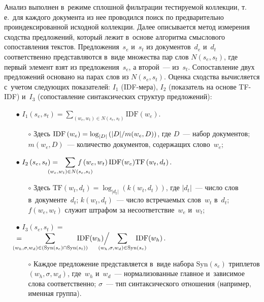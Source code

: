 \begin{multicols}{2}
  Анализ выполнен в~режиме сплошной фильтрации тестируемой коллекции, 
т.\,е.\ для каждого документа из нее проводился поиск по предварительно 
проиндексированной исходной коллекции. Далее описывается метод 
измерения сходства предложений, который лежит в~основе алгоритма 
смыслового сопоставления текстов. Предложения~$s_e$ и~$s_t$ из 
документов~$d_e$ и~$d_t$ соответственно представляются в~виде множества 
пар слов $N(s_e,s_t)$, где первый элемент взят из предложения~$s_e$, а 
второй~--- из~$s_t$. Сопоставление двух предложений основано на парах слов из 
$N(s_e,s_t)$. Оценка сходства вычисляется с~учетом сле\-ду\-ющих 
показателей: $I_1$ (IDF-ме\-ра), $I_2$ (показатель на основе TF-IDF) и~$I_3$ 
(сопоставление синтаксических структур предложений): 
  \begin{itemize}
  \item[$\bullet$]
  $I_1\left(s_e,s_t\right)= \displaystyle \sum\limits_{(w_e,w_t)\in N(s_e,s_t)} 
\mathrm{IDF}\left( w_e\right).$
  \begin{itemize}
  \item[$\circ$]
Здесь $\mathrm{IDF}\,(w_e)\hm= \log_{\vert D\vert} \left( \vert 
D\vert/m(w_e,D)\right)$, где $D$~---  набор документов; 
$m(w_e,D)$~--- количество документов, содержащих 
слово~$w_e$; 
\end{itemize}
\item[$\bullet$]
$I_2\left( s_e,s_t\right)=\displaystyle\hspace*{-6mm} \sum\limits_{(w_e,w_t)\in N(s_e,s_t)}\hspace*{-8mm} 
f\left( w_e,w_t\right)\mathrm{IDF}(w_e)\mathrm{TF}\left(w_t,d_t\right).$
  \begin{itemize}
  \item[$\circ$]
Здесь $\mathrm{TF}(w_t,d_t)=\log_{\vert d_t\vert}\left( k(w_t,d_t)\right)$, где $\vert 
d_t\vert$~--- число слов в~документе~$d_t$; $k(w_t,d_t)$~---  
число встречаемых слов~$w_t$ в~$d_t$; $f(w_e, w_t)$ служит 
штрафом за несоответствие~$w_e$ и~$w_t$;
\end{itemize}
\item[$\bullet$]
$I_3\left(s_e, s_t\right)=$\\
$= \displaystyle
\hspace*{-16pt}{\sum\limits_{(w_h,\sigma,w_d)\in 
(\mathrm{Syn}(s_e)\cap \mathrm{Syn}(s_t))} \hspace*{-17pt}\mathrm{IDF}(w_h)}\Big /
\displaystyle\hspace*{-16pt}{\sum\limits_{(w_h,\sigma,w_d)\in 
\mathrm{Syn}(s_e)} \hspace*{-17pt}\mathrm{IDF}(w_h)}\,.$
  \begin{itemize}
  \item[$\circ$]
Каждое предложение представляется в~виде набора $\mathrm{Syn}(s_e)$ 
триплетов $(w_h,\sigma, w_d)$, где~$w_h$ и~$w_d$~--- 
нормализованные главное и~зависимое слова соответственно; 
$\sigma$~--- тип синтаксического отношения (например, именная 
группа).
  \end{itemize}
  \end{itemize}
  

\end{multicols}
